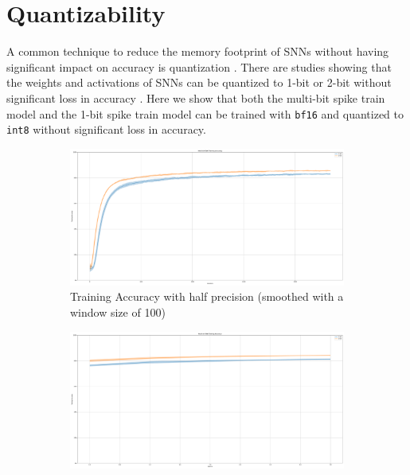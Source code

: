     \section{Quantizability}
    \label{sec:quantizability}
        A common technique to reduce the memory footprint of SNNs without having significant impact on accuracy is quantization \cite{9534087}. There are studies showing that the weights and activations of SNNs can be quantized to 1-bit or 2-bit without significant loss in accuracy \cite{10.1145/3664647.3681186}. Here we show that both the multi-bit spike train model and the 1-bit spike train model can be trained with \verb|bf16| and quantized to \verb|int8| without significant loss in accuracy.
        \begin{figure}[!htpb]
            \centering
            \begin{subfigure}[H]{0.48\textwidth}
                \centering
                \includegraphics[width=\textwidth]{../quantized/FashionMNIST/plots/fashionmnist_train_acc.pdf}
                \caption{Training Accuracy with half precision (smoothed with a window size of 100)}
            \end{subfigure}
            \hfill
            \begin{subfigure}[H]{0.48\textwidth}
                \centering
                \includegraphics[width=\textwidth]{../bf16/FashionMNIST/plots/fashionmnist_test_acc.pdf}

\end{subfigure}
\end{figure}
